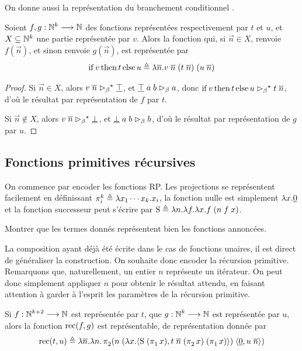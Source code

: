 \noindent
On donne aussi la représentation du branchement conditionnel
.

\begin{proposition}
  Soient $f,g : \displaystyle \mathbb N^k \longrightarrow \mathbb N$ des fonctions représentées
  respectivement par $t$ et $u$, et $X \subseteq \mathbb N^k$ une partie
  représentée par $v$. Alors la fonction qui, si $\vec n \in X$, renvoie
  $f(\vec n)$, et sinon renvoie $g(\vec n)$, est représentée par
  \[\operatorname{if} v \operatorname{then} t \operatorname{else} u \triangleq
  \lambda \overline{n}.v\;\overline{n}\;(t\;\overline{n})\;(u\;\overline{n})\]
\end{proposition}

\begin{proof}
  Si $\vec n \in X$, alors $v\;\overline{n} \mathrel{\rhd_{\beta}}^{\mathord{\star}} \underline{\top}$, et
  $\underline{\top}\;a\;b \mathrel{\rhd_{\beta}} a$, donc
  $\operatorname{if} v \operatorname{then} t \operatorname{else} u \mathrel{\rhd_{\beta}}^{\mathord{\star}} t\;\overline{n}$, d'où le résultat
  par représentation de $f$ par $t$.

  Si $\vec n \notin X$, alors $v\;\overline{n} \mathrel{\rhd_{\beta}}^{\mathord{\star}} \underline{\bot}$, et
  $\underline{\bot}\;a\;b\mathrel{\rhd_{\beta}} b$, d'où le résultat par représentation
  de $g$ par $u$.
\end{proof}

\subsection{Fonctions primitives récursives}

On commence par encoder les fonctions RP. Les projections se représentent
facilement en définissant
$\mathop{\pi_{i}^{k}} \triangleq \lambda x_1\cdots x_k.x_i$,
la fonction nulle est simplement
$\lambda x.\underline{0}$
et la fonction successeur peut s'écrire par
$\operatorname{S} \triangleq \lambda n.\lambda f.\lambda x.f\;(n\;f\;x)$.

\begin{exercise}
  Montrer que les termes donnés représentent bien les fonctions annoncées.
\end{exercise}

La composition ayant déjà été écrite dans le cas de fonctions unaires, il est
direct de généraliser la construction. On souhaite donc encoder la récursion
primitive. Remarquons que, naturellement, un entier $n$ représente un itérateur.
On peut donc simplement appliquer $n$ pour obtenir le résultat attendu, en
faisant attention à garder à l'esprit les paramètres de la récursion primitive.

\begin{proposition}
  Si $f : \displaystyle \mathbb N^{k+2} \longrightarrow \mathbb N$ est représentée par $t$, que
  $g : \displaystyle \mathbb N^k \longrightarrow \mathbb N$ est représentée par $u$, alors la fonction
  $\operatorname{rec}(f,g)$ est représentable, de représentation donnée par
  \[\operatorname{rec}(t,u)\triangleq \lambda \overline{n}. \lambda n. \mathop{\pi_{2}^{}}(n\;
  (\lambda x. \langle \operatorname{S}\;(\mathop{\pi_{1}^{}}x),
  t\;\overline{n}\;(\mathop{\pi_{2}^{}}x)\;(\mathop{\pi_{1}^{}}x)\rangle)\;
  \langle \underline{0}, u\;\overline{n}\rangle)\]
\end{proposition}

